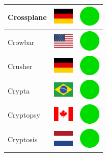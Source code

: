 \documentclass[12pt, a4paper, twoside]{report}
\begin{document}
\begin{center}
\begin{longtable}{|p{5cm}|p{2cm}|p{2cm}|}
Crossplane & \includegraphics[width=1cm]{4x3/de} & \includegraphics[width=1cm]{likes/y} \\ \hline
Crowbar & \includegraphics[width=1cm]{4x3/us} & \includegraphics[width=1cm]{likes/y} \\ \hline
Crusher & \includegraphics[width=1cm]{4x3/de} & \includegraphics[width=1cm]{likes/y} \\ \hline
Crypta & \includegraphics[width=1cm]{4x3/br} & \includegraphics[width=1cm]{likes/y} \\ \hline
Cryptopsy & \includegraphics[width=1cm]{4x3/ca} & \includegraphics[width=1cm]{likes/y} \\ \hline
Cryptosis & \includegraphics[width=1cm]{4x3/nl} & \includegraphics[width=1cm]{likes/y} \\ \hline

\end{longtable}
\end{center}
\end{document}

